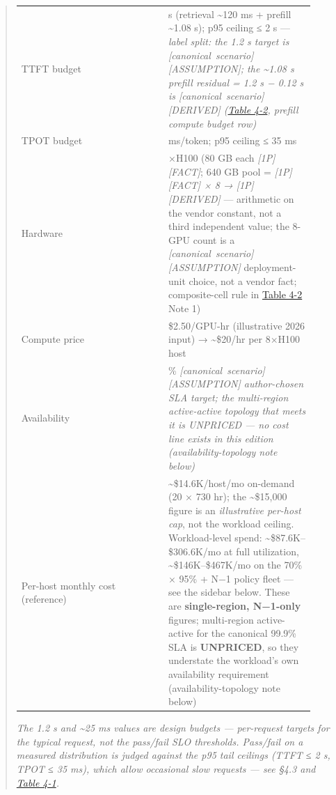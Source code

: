 \begin{quote}
\begin{longtable}[]{@{}
  >{\raggedright\arraybackslash}p{0.4527\linewidth}
  >{\raggedright\arraybackslash}p{0.4527\linewidth}@{}}
TTFT budget & 1.2 s (retrieval \textasciitilde120 ms + prefill
\textasciitilde1.08 s); p95 ceiling ≤ 2 s --- \emph{label split: the 1.2
s target is \mbox{{[}canonical scenario{]}}\hspace{0pt}\mbox{{[}ASSUMPTION{]}}; the
\textasciitilde1.08 s prefill residual = 1.2 s − 0.12 s is \mbox{{[}canonical
scenario{]}}\hspace{0pt}\mbox{{[}DERIVED{]}} (\hyperref[tab:4.2]{Table 4-2}, prefill compute budget row)} \\
TPOT budget & 25 ms/token; p95 ceiling ≤ 35 ms \\
Hardware & 8×H100 (80 GB each \emph{\mbox{{[}1P{]}}\hspace{0pt}\mbox{{[}FACT{]}}}; 640 GB pool =
\emph{\mbox{{[}1P{]}}\hspace{0pt}\mbox{{[}FACT{]}} × 8 → \mbox{{[}1P{]}}\hspace{0pt}\mbox{{[}DERIVED{]}}} --- arithmetic on
the vendor constant, not a third independent value; the 8-GPU count is a
\emph{\mbox{{[}canonical scenario{]}}\hspace{0pt}\mbox{{[}ASSUMPTION{]}}} deployment-unit choice,
not a vendor fact; composite-cell rule in \hyperref[tab:4.2]{Table 4-2} Note 1) \\
Compute price & \$2.50/GPU-hr (illustrative 2026 input) →
\textasciitilde\$20/hr per 8×H100 host \\
Availability & 99.9\% \emph{\mbox{{[}canonical scenario{]}}\hspace{0pt}\mbox{{[}ASSUMPTION{]}}
author-chosen SLA target; the multi-region active-active topology that
meets it is UNPRICED --- no cost line exists in this edition
(availability-topology note below)} \\
Per-host monthly cost (reference) & \textasciitilde\$14.6K/host/mo
on-demand (20 × 730 hr); the \textasciitilde\$15,000 figure is an
\emph{illustrative per-host cap}, not the workload ceiling.
Workload-level spend: \textasciitilde\$87.6K--\$306.6K/mo at full
utilization, \textasciitilde\$146K--\$467K/mo on the 70\% × 95\% + N−1
policy fleet --- see the sidebar below. These are \textbf{single-region,
N−1-only} figures; multi-region active-active for the canonical 99.9\%
SLA is \textbf{UNPRICED}, so they understate the workload's own
availability requirement (availability-topology note below) \\
\end{longtable}

\emph{The 1.2 s and \textasciitilde25 ms values are design budgets ---
per-request targets for the typical request, not the pass/fail SLO
thresholds. Pass/fail on a measured distribution is judged against the
p95 tail ceilings (TTFT ≤ 2 s, TPOT ≤ 35 ms), which allow occasional
slow requests --- see §4.3 and \hyperref[tab:4.1]{Table 4-1}.}


\end{quote}
